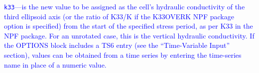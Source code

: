 \begin{description}
\item \textcolor{blue}{\texttt{k33}---is the new value to be assigned as the cell's hydraulic conductivity of the third ellipsoid axis (or the ratio of K33/K if the K33OVERK NPF package option is specified) from the start of the specified stress period, as per K33 in the NPF package.  For an unrotated case, this is the vertical hydraulic conductivity.  If the OPTIONS block includes a TS6 entry (see the ``Time-Variable Input'' section), values can be obtained from a time series by entering the time-series name in place of a numeric value.}

\end{description}

